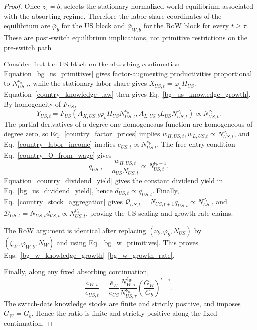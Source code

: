 \documentclass{article}
\begin{document}
\begin{proof}
Once $z_\tau=b$,  selects the stationary normalized world equilibrium associated with the absorbing regime. Therefore the labor-share coordinates of the equilibrium are $\bar\varphi_b$ for the US block and $\bar\varphi_{W,b}$ for the RoW block for every $t\ge\tau$. These are post-switch equilibrium implications, not primitive restrictions on the pre-switch path.

Consider first the US block on the absorbing continuation. Equation~\eqref{bg_us_primitives} gives factor-augmenting productivities proportional to $N_{US,t}^{\nu_b}$, while the stationary labor share gives $X_{US,t}=\bar\varphi_bH_{US}$. Equation~\eqref{country_knowledge_law} then gives Eq.~\eqref{bg_us_knowledge_growth}. By homogeneity of $F_{US}$,
\[
Y_{US,t}
=
F_{US}(\bar A_{X,US,b}\bar\varphi_bH_{US}N_{US,t}^{\nu_b},\bar A_{L,US,b}L_{US}N_{US,t}^{\nu_b})
\propto N_{US,t}^{\nu_b}.
\]
The partial derivatives of a degree-one homogeneous function are homogeneous of degree zero, so Eq.~\eqref{country_factor_prices} implies $w_{H,US,t},w_{L,US,t}\propto N_{US,t}^{\nu_b}$, and Eq.~\eqref{country_labor_income} implies $e_{US,t}\propto N_{US,t}^{\nu_b}$. The free-entry condition Eq.~\eqref{country_Q_from_wage} gives
\[
q_{US,t}=\frac{w_{H,US,t}}{a_{US}N_{US,t}}\propto N_{US,t}^{\nu_b-1}.
\]
Equation~\eqref{country_dividend_yield} gives the constant dividend yield in Eq.~\eqref{bg_us_dividend_yield}, hence $d_{US,t}\propto q_{US,t}$. Finally, Eq.~\eqref{country_stock_aggregation} gives $\mathcal Q_{US,t}=N_{US,t+1}q_{US,t}\propto N_{US,t}^{\nu_b}$ and $\mathcal D_{US,t}=N_{US,t}d_{US,t}\propto N_{US,t}^{\nu_b}$, proving the US scaling and growth-rate claims.

The RoW argument is identical after replacing $(\nu_b,\bar\varphi_b,N_{US})$ by $(\xi_W,\bar\varphi_{W,b},N_W)$ and using Eq.~\eqref{bg_w_primitives}. This proves Eqs.~\eqref{bg_w_knowledge_growth}--\eqref{bg_w_growth_rate}.

Finally, along any fixed absorbing continuation,
\[
\frac{e_{W,t}}{e_{US,t}}
=
\frac{\bar e_W}{\bar e_{US}}
\frac{N_{W,\tau}^{\xi_W}}{N_{US,\tau}^{\nu_b}}
\left(\frac{G_W}{G_b}\right)^{t-\tau}.
\]
The switch-date knowledge stocks are finite and strictly positive, and  imposes $G_W=G_b$. Hence the ratio is finite and strictly positive along the fixed continuation.
\end{proof}
\end{document}

